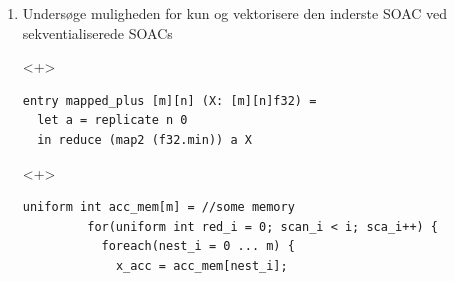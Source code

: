 \documentclass[t]{beamer}
\begin{document}
\begin{frame}[fragile]
\begin{enumerate}
    \item<+-> Undersøge muligheden for kun og vektorisere den inderste SOAC ved sekventialiserede SOACs
          \begin{onlyenv}<+>
\begin{lstlisting}[language=futhark]
entry mapped_plus [m][n] (X: [m][n]f32) =
  let a = replicate n 0
  in reduce (map2 (f32.min)) a X
\end{lstlisting}
          \end{onlyenv}
  \begin{onlyenv}<+>
   \begin{lstlisting}[language=ispc, xleftmargin=-15mm]
         uniform int acc_mem[m] = //some memory
         for(uniform int red_i = 0; scan_i < i; sca_i++) {
           foreach(nest_i = 0 ... m) {
             x_acc = acc_mem[nest_i];

\end{lstlisting}
\end{onlyenv}
\end{enumerate}
\end{frame}
\end{document}
